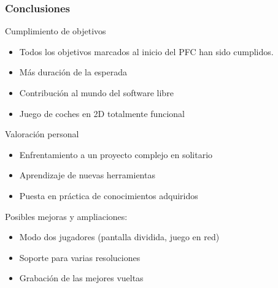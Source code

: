 \begin{frame}
    \frametitle{Conclusiones}

        \begin{block}{Cumplimiento de objetivos}
            \begin{itemize}
                \item Todos los objetivos marcados al inicio del PFC han sido cumplidos.
                \item Más duración de la esperada
                \item Contribución al mundo del software libre
                \item Juego de coches en 2D totalmente funcional
            \end{itemize}
        \end{block}

        \begin{block}{Valoración personal}
            \begin{itemize}
                \item Enfrentamiento a un proyecto complejo en solitario
                \item Aprendizaje de nuevas herramientas
                \item Puesta en práctica de conocimientos adquiridos
            \end{itemize}
        \end{block}


        \begin{block}{Posibles mejoras y ampliaciones:}
            \begin{itemize}
                \item Modo dos jugadores (pantalla dividida, juego en red)
                
                \item Soporte para varias resoluciones
                
                \item Grabación de las mejores vueltas
            \end{itemize}
        \end{block}
        
\end{frame}

